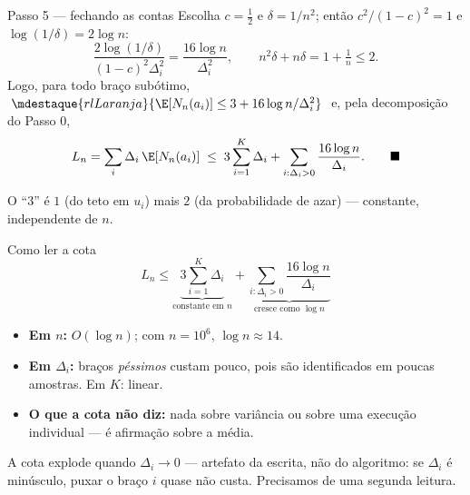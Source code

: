 \documentclass[aspectratio=169, 11pt]{beamer}
\begin{document}
\begin{frame}{Passo 5 --- fechando as contas}
  Escolha $c=\tfrac12$ e $\delta = 1/n^{2}$; então
  $c^{2}/(1-c)^{2}=1$ e $\log(1/\delta)=2\log n$:
  \[
    \frac{2\log(1/\delta)}{(1-c)^{2}\Delta_i^{2}} = \frac{16\log n}{\Delta_i^{2}},
    \qquad
    n^{2}\delta + n\delta = 1 + \tfrac1n \le 2 .
  \]
  Logo, para todo braço subótimo,
  $\;\mdestaque{rlLaranja}{\E[N_n(a_i)] \le 3 + 16\log n/\Delta_i^{2}}\;$
  e, pela decomposição do Passo 0,
  \[
    L_n = \sum_i \Delta_i\,\E[N_n(a_i)]
      \;\le\; 3\sum_{i=1}^{K}\Delta_i + \sum_{i:\Delta_i>0}\frac{16\log n}{\Delta_i}.
    \qquad\blacksquare
  \]

  {\small\color{rlCinza} O ``3'' é $1$ (do teto em $u_i$) mais $2$ (da
  probabilidade de azar) --- constante, independente de $n$.}
\end{frame}

\begin{frame}{Como ler a cota}
  \[
    L_n \le \underbrace{3\sum_{i=1}^{K}\Delta_i}_{\text{constante em }n}
      + \underbrace{\sum_{i:\Delta_i>0}\frac{16\log n}{\Delta_i}}_{\text{cresce como }\log n}
  \]
  \vspace{-0.4em}
  {\small
  \begin{itemize}\setlength{\itemsep}{0.2ex}
    \item \textbf{Em $n$:} $O(\log n)$; com $n=10^{6}$, $\log n \approx 14$.
    \item \textbf{Em $\Delta_i$:} braços \emph{péssimos} custam pouco, pois são
          identificados em poucas amostras. Em $K$: linear.
    \item \textbf{O que a cota não diz:} nada sobre variância ou sobre uma
          execução individual --- é afirmação sobre a média.
  \end{itemize}}

  \begin{alertabox}
    A cota \alert{explode quando $\Delta_i\to 0$} --- artefato da escrita, não
    do algoritmo: se $\Delta_i$ é minúsculo, puxar o braço $i$ quase não custa.
    Precisamos de uma segunda leitura.
  \end{alertabox}
\end{frame}
\end{document}
